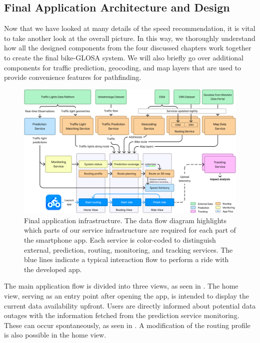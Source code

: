 \subsection{Final Application Architecture and Design}

Now that we have looked at many details of the speed recommendation, it is vital to take another look at the overall picture. In this way, we thoroughly understand how all the designed components from the four discussed chapters work together to create the final bike-GLOSA system. We will also briefly go over additional components for traffic prediction, geocoding, and map layers that are used to provide convenience features for pathfinding.

\begin{figure}[!b]
\caption{Final application infrastructure. The data flow diagram highlights which parts of our service infrastructure are required for each part of the smartphone app. Each service is color-coded to distinguish external, prediction, routing, monitoring, and tracking services. The blue lines indicate a typical interaction flow to perform a ride with the developed app.}\label{fig:architecture}
\includegraphics[width=\linewidth]{images/architecture.pdf}
\end{figure}

The main application flow is divided into three views, as seen in . The home view, serving as an entry point after opening the app, is intended to display the current data availability upfront. Users are directly informed about potential data outages with the information fetched from the prediction service monitoring. These can occur spontaneously, as seen in . A modification of the routing profile is also possible in the home view.

